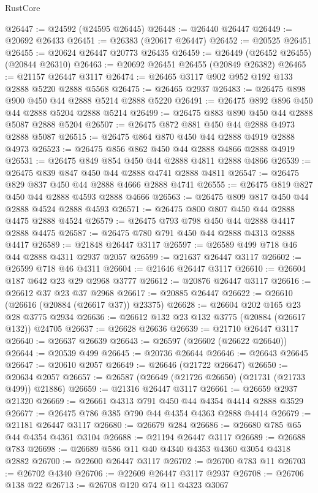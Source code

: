 \begin{lexlean}{RustCore}
\begin{coremodule}
@26447 := @24592 (@24595 @26445)
@26448 := @26440 @26447
@26449 := @20692 @26433
@26451 := @26383 (@20617 @26447)
@26452 := @20525 @26451
@26455 := @20624 @26447 @20773 @26435
@26459 := @26449 (@26452 @26455) (@20844 @26310)
@26463 := @20692 @26451 @26455 (@20849 @26382)
@26465 := @21157 @26447 @3117
@26474 := @26465 @3117 @902 @952 @192 @133 @2888 @5220 @2888 @5568
@26475 := @26465 @2937
@26483 := @26475 @898 @900 @450 @44 @2888 @5214 @2888 @5220
@26491 := @26475 @892 @896 @450 @44 @2888 @5204 @2888 @5214
@26499 := @26475 @883 @890 @450 @44 @2888 @5087 @2888 @5204
@26507 := @26475 @872 @881 @450 @44 @2888 @4973 @2888 @5087
@26515 := @26475 @864 @870 @450 @44 @2888 @4919 @2888 @4973
@26523 := @26475 @856 @862 @450 @44 @2888 @4866 @2888 @4919
@26531 := @26475 @849 @854 @450 @44 @2888 @4811 @2888 @4866
@26539 := @26475 @839 @847 @450 @44 @2888 @4741 @2888 @4811
@26547 := @26475 @829 @837 @450 @44 @2888 @4666 @2888 @4741
@26555 := @26475 @819 @827 @450 @44 @2888 @4593 @2888 @4666
@26563 := @26475 @809 @817 @450 @44 @2888 @4524 @2888 @4593
@26571 := @26475 @800 @807 @450 @44 @2888 @4475 @2888 @4524
@26579 := @26475 @793 @798 @450 @44 @2888 @4417 @2888 @4475
@26587 := @26475 @780 @791 @450 @44 @2888 @4313 @2888 @4417
@26589 := @21848 @26447 @3117
@26597 := @26589 @499 @718 @46 @44 @2888 @4311 @2937 @2057
@26599 := @21637 @26447 @3117
@26602 := @26599 @718 @46 @4311
@26604 := @21646 @26447 @3117
@26610 := @26604 @187 @642 @23 @29 @2968 @3777
@26612 := @20876 @26447 @3117
@26616 := @26612 @37 @23 @37 @2968
@26617 := @20885 @26447
@26622 := @26610 (@26616 (@20884 (@26617 @37)) @23375)
@26628 := @26604 @202 @165 @23 @28 @3775 @2934
@26636 := @26612 @132 @23 @132 @3775 (@20884 (@26617 @132)) @24705
@26637 := @26628 @26636
@26639 := @21710 @26447 @3117
@26640 := @26637 @26639
@26643 := @26597 (@26602 (@26622 @26640))
@26644 := @20539 @499
@26645 := @20736 @26644
@26646 := @26643 @26645
@26647 := @20610 @2057
@26649 := @26646 (@21722 @26647)
@26650 := @20634 @2057
@26657 := @26587 (@26649 (@21726 @26650) (@21731 (@21733 @499)) @21886)
@26659 := @21316 @26447 @3117
@26661 := @26659 @2937 @21320
@26669 := @26661 @4313 @791 @450 @44 @4354 @4414 @2888 @3529
@26677 := @26475 @786 @385 @790 @44 @4354 @4363 @2888 @4414
@26679 := @21181 @26447 @3117
@26680 := @26679 @284
@26686 := @26680 @785 @65 @44 @4354 @4361 @3104
@26688 := @21194 @26447 @3117
@26689 := @26688 @783
@26698 := @26689 @586 @11 @40 @4340 @4353 @4360 @3054 @4318 @2882
@26700 := @22600 @26447 @3117
@26702 := @26700 @783 @11
@26703 := @26702 @4340
@26706 := @22609 @26447 @3117 @2937
@26708 := @26706 @138 @22
@26713 := @26708 @120 @74 @11 @4323 @3067

\end{coremodule}
\end{lexlean}
